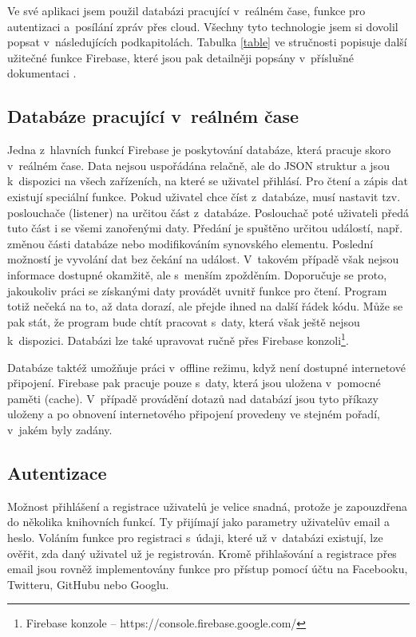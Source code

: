 Ve své aplikaci jsem použil databázi pracující v~reálném čase, funkce pro autentizaci a~posílání zpráv přes cloud. Všechny tyto technologie jsem si dovolil popsat v~následujících podkapitolách. Tabulka \ref{table} ve stručnosti popisuje další užitečné funkce Firebase, které jsou pak detailněji popsány v~příslušné dokumentaci \cite{firebase}.

\subsection*{Databáze pracující v~reálném čase}
Jedna z~hlavních funkcí Firebase je poskytování databáze, která pracuje skoro v~reálném čase. Data nejsou uspořádána relačně, ale do JSON struktur a jsou k~dispozici na všech zařízeních, na které se uživatel přihlásí. Pro čtení a zápis dat existují speciální funkce. Pokud uživatel chce číst z~databáze, musí nastavit tzv. poslouchače (listener) na určitou část z~databáze. Poslouchač poté uživateli předá tuto část i se všemi zanořenými daty. Předání je spuštěno určitou událostí, např. změnou části databáze nebo modifikováním synovského elementu. Poslední možností je vyvolání dat bez čekání na událost. V~takovém případě však nejsou informace dostupné okamžitě, ale s~menším zpožděním. Doporučuje se proto, jakoukoliv práci se získanými daty provádět uvnitř funkce pro čtení. Program totiž nečeká na to, až data dorazí, ale přejde ihned na další řádek kódu. Může se pak stát, že program bude chtít pracovat s~daty, která však ještě nejsou k~dispozici. Databázi lze také upravovat ručně přes Firebase konzoli\footnote{Firebase konzole --  https://console.firebase.google.com/}.   

Databáze taktéž umožňuje práci v~offline režimu, když není dostupné internetové připojení. Firebase pak pracuje pouze s~daty, která jsou uložena v~pomocné paměti (cache). V~případě provádění dotazů nad databází jsou tyto příkazy uloženy a po obnovení internetového připojení provedeny ve stejném pořadí, v~jakém byly zadány.

\subsection*{Autentizace}
Možnost přihlášení a registrace uživatelů je velice snadná, protože je zapouzdřena do několika knihovních funkcí. Ty přijímají jako parametry uživatelův email a heslo. Voláním funkce pro registraci s~údaji, které už v~databázi existují, lze ověřit, zda daný uživatel už je registrován. Kromě přihlašování a registrace přes email jsou rovněž implementovány funkce pro přístup pomocí účtu na Facebooku, Twitteru, GitHubu nebo Googlu.

